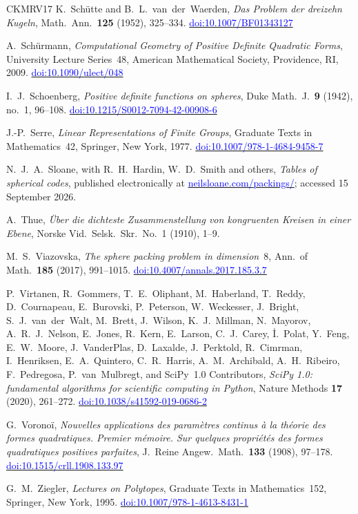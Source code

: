 \documentclass[11pt,reqno]{amsart}
\newcommand{\bluelink}[2]{\href{#1}{\textcolor{blue}{#2}}}
\renewcommand{\_}{\origunderscore\allowbreak}
\numberwithin{equation}{section}
\theoremstyle{plain}
\theoremstyle{definition}
\theoremstyle{remark}
\begin{document}
\begin{thebibliography}{CKMRV17}
K.~Sch\"utte and B.~L.~van~der~Waerden,
\textit{Das Problem der dreizehn Kugeln},
Math.\ Ann.\ \textbf{125} (1952), 325--334.
\bluelink{https://doi.org/10.1007/BF01343127}{doi:10.1007/BF01343127}

A.~Sch\"urmann,
\textit{Computational Geometry of Positive Definite Quadratic Forms},
University Lecture Series~48, American Mathematical Society, Providence, RI, 2009.
\bluelink{https://doi.org/10.1090/ulect/048}{doi:10.1090/ulect/048}

I.~J.~Schoenberg,
\textit{Positive definite functions on spheres},
Duke Math.\ J.\ \textbf{9} (1942), no.~1, 96--108.
\bluelink{https://doi.org/10.1215/S0012-7094-42-00908-6}{doi:10.1215/S0012-7094-42-00908-6}

J.-P.~Serre,
\textit{Linear Representations of Finite Groups},
Graduate Texts in Mathematics~42, Springer, New York, 1977.
\bluelink{https://doi.org/10.1007/978-1-4684-9458-7}{doi:10.1007/978-1-4684-9458-7}

N.~J.~A.~Sloane, with R.~H.~Hardin, W.~D.~Smith and others,
\textit{Tables of spherical codes}, published electronically at
\bluelink{http://neilsloane.com/packings/}{neilsloane.com/packings/};
accessed 15 September 2026.

A.~Thue,
\textit{\"Uber die dichteste Zusammenstellung von kongruenten Kreisen in einer Ebene},
Norske Vid.\ Selsk.\ Skr.\ No.~1 (1910), 1--9.

M.~S.~Viazovska,
\textit{The sphere packing problem in dimension~$8$},
Ann.\ of Math.\ \textbf{185} (2017), 991--1015.
\bluelink{https://doi.org/10.4007/annals.2017.185.3.7}{doi:10.4007/annals.2017.185.3.7}

P.~Virtanen, R.~Gommers, T.~E.~Oliphant, M.~Haberland, T.~Reddy,
D.~Cournapeau, E.~Burovski, P.~Peterson, W.~Weckesser, J.~Bright,
S.~J.~van~der~Walt, M.~Brett, J.~Wilson, K.~J.~Millman, N.~Mayorov,
A.~R.~J.~Nelson, E.~Jones, R.~Kern, E.~Larson, C.~J.~Carey,
\.{I}.~Polat, Y.~Feng, E.~W.~Moore, J.~VanderPlas, D.~Laxalde,
J.~Perktold, R.~Cimrman, I.~Henriksen, E.~A.~Quintero, C.~R.~Harris,
A.~M.~Archibald, A.~H.~Ribeiro, F.~Pedregosa, P.~van~Mulbregt, and
SciPy~1.0 Contributors,
\textit{{S}ci{P}y 1.0: fundamental algorithms for scientific computing in
{P}ython},
Nature Methods \textbf{17} (2020), 261--272.
\bluelink{https://doi.org/10.1038/s41592-019-0686-2}{doi:10.1038/s41592-019-0686-2}

G.~Vorono\"i,
\textit{Nouvelles applications des param\`etres continus \`a la th\'eorie des
formes quadratiques. Premier m\'emoire. Sur quelques propri\'et\'es des formes
quadratiques positives parfaites},
J.\ Reine Angew.\ Math.\ \textbf{133} (1908), 97--178.
\bluelink{https://doi.org/10.1515/crll.1908.133.97}{doi:10.1515/crll.1908.133.97}

G.~M.~Ziegler,
\textit{Lectures on Polytopes},
Graduate Texts in Mathematics~152, Springer, New York, 1995.
\bluelink{https://doi.org/10.1007/978-1-4613-8431-1}{doi:10.1007/978-1-4613-8431-1}

\end{thebibliography}
\end{document}
